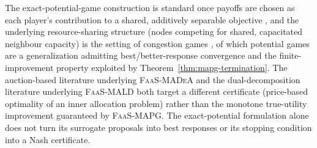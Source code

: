 The exact-potential-game construction is standard once payoffs are chosen as
each player's contribution to a shared, additively separable objective
\citep{monderershapley1996}, and the underlying resource-sharing structure
(nodes competing for shared, capacitated neighbour capacity) is the setting
of congestion games \citep{rosenthal1973}, of which potential games are a
generalization admitting best/better-response convergence and the
finite-improvement property exploited by Theorem~\ref{thm:mapg-termination}.
The auction-based literature underlying \textsc{FaaS-MADeA}
\citep{bertsekas1988} and the dual-decomposition literature underlying
\textsc{FaaS-MALD} \citep{bertsekas1989,nedic2009} both target a different
certificate (price-based optimality of an inner allocation problem) rather
than the monotone true-utility improvement guaranteed by \textsc{FaaS-MAPG}.
The exact-potential formulation alone does not turn its surrogate proposals
into best responses or its stopping condition into a Nash certificate.
